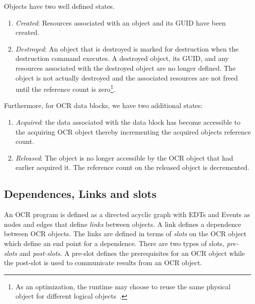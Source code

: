 Objects have two well defined states.
\begin{enumerate}
\item \emph{Created}: Resources associated with an object and its GUID
have been created.
\item \emph{Destroyed}: An object that is destroyed is marked for
destruction when the destruction command executes. A destroyed object, its GUID,
and any resources associated with the destroyed object are no longer
defined. The object is not actually destroyed and the associated
resources are not freed until the reference count is zero\footnote{As
an optimization, the runtime may choose to reuse the same physical
object for different logical objects~\cite{USBCSS12,SbKS12}.}.
%
\end{enumerate}
Furthermore, for OCR data blocks, we have two additional states:
\begin{enumerate}
\item \emph{Acquired}: the data associated with the data block has
become accessible to the acquiring OCR object thereby incrementing the
acquired objects reference count.
\item \emph{Released}: The object is no longer accessible by the OCR
object that had earlier acquired it. The reference count on the
released object is decremented.
\end{enumerate}



\subsection{Dependences, Links and slots}
\label{sec:OCRlinks}

An OCR program is defined as a directed acyclic graph
with EDTs and Events as nodes and edges that define
\emph{links} between objects. A link defines a dependence
between OCR objects. The links are defined in terms of
\emph{slots} on the OCR object which define an end
point for a dependence.
There are two
types of slots, \emph{pre-slots} and \emph{post-slots}.   A pre-slot defines the prerequisites for
an OCR object while the post-slot is used to communicate results from an OCR object.

